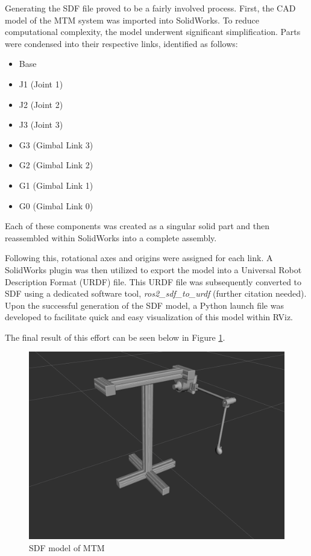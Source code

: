 Generating the SDF file proved to be a fairly involved process. First, the CAD model of the MTM system was imported into SolidWorks. To reduce computational complexity, the model underwent significant simplification. Parts were condensed into their respective links, identified as follows:

\begin{itemize}
    \item Base
    \item J1 (Joint 1)
    \item J2 (Joint 2)
    \item J3 (Joint 3)
    \item G3 (Gimbal Link 3)
    \item G2 (Gimbal Link 2)
    \item G1 (Gimbal Link 1)
    \item G0 (Gimbal Link 0)
\end{itemize}

Each of these components was created as a singular solid part and then reassembled within SolidWorks into a complete assembly.

Following this, rotational axes and origins were assigned for each link. A SolidWorks plugin was then utilized to export the model into a Universal Robot Description Format (URDF) file. This URDF file was subsequently converted to SDF using a dedicated software tool, \textit{ros2\_sdf\_to\_urdf} (further citation needed). Upon the successful generation of the SDF model, a Python launch file was developed to facilitate quick and easy visualization of this model within RViz.

The final result of this effort can be seen below in Figure \ref{fig:mtm_sdf_model}.

\begin{figure}[h]
    \centering
    \includegraphics[width=0.75\linewidth]{mtm_sdf_model.png}
    \caption{SDF model of MTM}
    \label{fig:mtm_sdf_model}
\end{figure}

